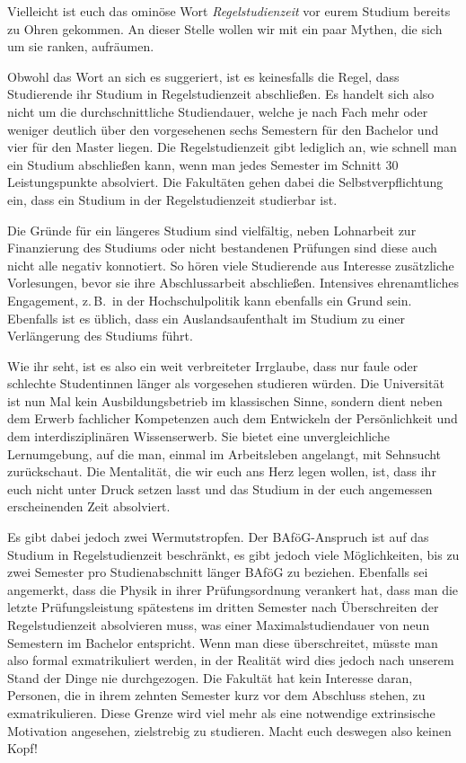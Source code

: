 Vielleicht ist euch das ominöse Wort \emph{Regelstudienzeit} vor eurem Studium bereits zu Ohren gekommen. An dieser Stelle wollen wir mit ein paar Mythen, die sich um sie ranken, aufräumen.

Obwohl das Wort an sich es suggeriert, ist es keinesfalls die Regel, dass Studierende ihr Studium in Regelstudienzeit abschließen. Es handelt sich also nicht um die durchschnittliche Studiendauer, welche je nach Fach mehr oder weniger deutlich über den vorgesehenen sechs Semestern für den Bachelor und vier für den Master liegen. Die Regelstudienzeit gibt lediglich an, wie schnell man ein Studium abschließen kann, wenn man jedes Semester im Schnitt 30 Leistungspunkte absolviert. Die Fakultäten gehen dabei die Selbstverpflichtung ein, dass ein Studium in der Regelstudienzeit studierbar ist.

Die Gründe für ein längeres Studium sind vielfältig, neben Lohnarbeit zur Finanzierung des Studiums oder nicht bestandenen Prüfungen sind diese auch nicht alle negativ konnotiert. So hören viele Studierende aus Interesse zusätzliche Vorlesungen, bevor sie ihre Abschlussarbeit abschließen. Intensives ehrenamtliches Engagement, z.\,B.~in der Hochschulpolitik kann ebenfalls ein Grund sein. Ebenfalls ist es üblich, dass ein Auslandsaufenthalt im Studium zu einer Verlängerung des Studiums führt.

Wie ihr seht, ist es also ein weit verbreiteter Irrglaube, dass nur faule oder schlechte Studentinnen länger als vorgesehen studieren würden. Die Universität ist nun Mal kein Ausbildungsbetrieb im klassischen Sinne, sondern dient neben dem Erwerb fachlicher Kompetenzen auch dem Entwickeln der Persönlichkeit und dem interdisziplinären Wissenserwerb. Sie bietet eine unvergleichliche Lernumgebung, auf die man, einmal im Arbeitsleben angelangt, mit Sehnsucht zurückschaut. Die Mentalität, die wir euch ans Herz legen wollen, ist, dass ihr euch nicht unter Druck setzen lasst und das Studium in der euch angemessen erscheinenden Zeit absolviert.

Es gibt dabei jedoch zwei Wermutstropfen. Der BAföG-Anspruch ist auf das Studium in Regelstudienzeit beschränkt, es gibt jedoch viele Möglichkeiten, bis zu zwei Semester pro Studienabschnitt länger BAföG zu beziehen. Ebenfalls sei angemerkt, dass die Physik in ihrer Prüfungsordnung verankert hat, dass man die letzte Prüfungsleistung spätestens im dritten Semester nach Überschreiten der Regelstudienzeit absolvieren muss, was einer Maximalstudiendauer von neun Semestern im Bachelor entspricht. Wenn man diese überschreitet, müsste man also formal exmatrikuliert werden, in der Realität wird dies jedoch nach unserem Stand der Dinge nie durchgezogen. Die Fakultät hat kein Interesse daran, Personen, die in ihrem zehnten Semester kurz vor dem Abschluss stehen, zu exmatrikulieren. Diese Grenze wird viel mehr als eine notwendige extrinsische Motivation angesehen, zielstrebig zu studieren. Macht euch deswegen also keinen Kopf!

